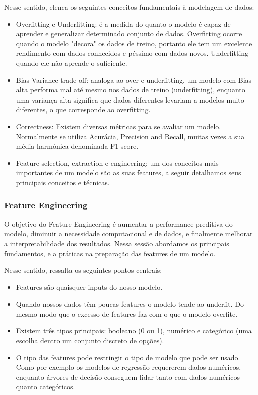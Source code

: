 \documentclass{article}
\begin{document}
Nesse sentido, \cite{SCRATCH} elenca os seguintes conceitos fundamentais à modelagem de dados:
\begin{itemize}
\item Overfitting e Underfitting: é a medida do quanto o modelo é capaz de aprender e generalizar determinado conjunto de dados. Overfitting ocorre quando o modelo "decora" os dados de treino, portanto ele tem um excelente rendimento com dados conhecidos e péssimo com dados novos. Underfitting quando ele não aprende o suficiente.
\item Bias-Variance trade off: analoga ao over e underfitting, um modelo com Bias alta performa mal até mesmo nos dados de treino (underfitting), enquanto uma variança alta significa que dados diferentes levariam a modelos muito diferentes, o que corresponde ao overfitting.
\item Correctness: Existem diversas métricas para se avaliar um modelo. Normalmente se utiliza Acurácia,  Precision and Recall, muitas vezes a sua média harmônica denominada F1-score. 
\item Feature selection, extraction e engineering: um dos conceitos mais importantes de um modelo são as suas features, a seguir detalhamos seus principais conceitos e técnicas.
\end{itemize}

\subsubsection{Feature Engineering} \label{feature-Eng}
O objetivo do Feature Engineering é aumentar a performance preditiva do modelo, diminuir a necessidade computacional e de dados, e finalmente melhorar a interpretabilidade dos resultados. Nessa sessão abordamos os principais fundamentos, e a práticas na preparação das features de um modelo. 

Nesse sentido, \cite{SCRATCH} ressalta os seguintes pontos centrais:
\begin{itemize}
\item Features são quaisquer inputs do nosso modelo. 
\item Quando nossos dados têm poucas features o modelo tende ao underfit. Do mesmo modo que o excesso de features faz com o que o modelo overfite. 
\item Existem três tipos principais: booleano (0 ou 1), numérico e categórico (uma escolha dentro um conjunto discreto de opções).
\item O tipo das features pode restringir o tipo de modelo que pode ser usado. Como por exemplo os modelos de regressão requererem dados numéricos, enquanto árvores de decisão conseguem lidar tanto com dados numéricos quanto categóricos.
\end{itemize}
\end{document}

